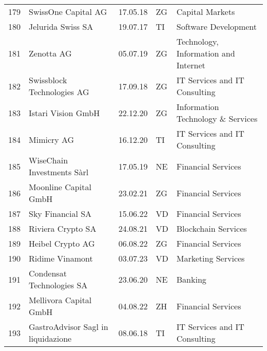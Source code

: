 \begin{tabular}{lllll}
179 &                                SwissOne Capital AG &      17.05.18 &     ZG &                                Capital Markets \\
180 &                                  Jelurida Swiss SA &      19.07.17 &     TI &                           Software Development \\
181 &                                         Zenotta AG &      05.07.19 &     ZG &           Technology, Information and Internet \\
182 &                         Swissblock Technologies AG &      17.09.18 &     ZG &                  IT Services and IT Consulting \\
183 &                                 Istari Vision GmbH &      22.12.20 &     ZG &              Information Technology \& Services \\
184 &                                         Mimicry AG &      16.12.20 &     TI &                  IT Services and IT Consulting \\
185 &                         WiseChain Investments Sàrl &      17.05.19 &     NE &                             Financial Services \\
186 &                              Moonline Capital GmbH &      23.02.21 &     ZG &                             Financial Services \\
187 &                                   Sky Financial SA &      15.06.22 &     VD &                             Financial Services \\
188 &                                  Riviera Crypto SA &      24.08.21 &     VD &                            Blockchain Services \\
189 &                                   Heibel Crypto AG &      06.08.22 &     ZG &                             Financial Services \\
190 &                                    Ridime Vinamont &      03.07.23 &     VD &                             Marketing Services \\
191 &                          Condensat Technologies SA &      23.06.20 &     NE &                                        Banking \\
192 &                             Mellivora Capital GmbH &      04.08.22 &     ZH &                             Financial Services \\
193 &                 GastroAdvisor Sagl in liquidazione &      08.06.18 &     TI &                  IT Services and IT Consulting \\

\end{tabular}
